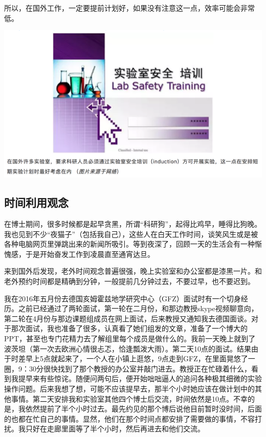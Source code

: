 \documentclass[]{book}
\begin{document}
所以，在国外工作，一定要提前计划好，如果没有注意这一点，效率可能会非常低。

\includegraphics[width=8.33in]{images/osre3}

\subsection{时间利用观念}

在博士期间，很多时候都是起早贪黑，所谓``科研狗''，起得比鸡早，睡得比狗晚。我也见到不少``夜猫子''（包括我自己），这些人在白天工作时间，谈笑风生或是被各种电脑网页里弹跳出来的新闻所吸引。等到夜深了，回顾一天的生活会有一种惭愧感，于是开始奋发工作到凌晨直至通宵达旦。

来到国外后发现，老外时间观念普遍很强，晚上实验室和办公室都是漆黑一片。和老外预约时间都是精确到分钟，一般提前几分钟过去，不要过早，也不要迟到。

我在2016年五月份去德国亥姆霍兹地学研究中心（GFZ）面试时有一个切身经历。之前已经通过了两轮面试，第一轮在二月份，和那边教授skype视频聊意向，第二轮在4月份与那边课题组成员在网上面试，后来教授又通知我去德国面谈。对于那次面试，我也准备了很多，认真看了她们组发的文章，准备了一个博大的PPT，甚至也专门花精力去了解组里每个成员是做什么的。我前一天晚上就到了波茨坦（第一次去欧洲心情很忐忑，恰逢瓢泼大雨）。第二天10点的面试。结果由于时差早上5点就起来了，一个人在小镇上逛悠，9点走到GFZ，在里面晃悠了一圈，9：30分很快找到了那个教授的办公室并敲门进去。教授正在忙碌着什么，看到我提早来有些惊诧。随便问两句后，便开始咄咄逼人的追问各种极其细微的实验操作问题。后来我想了想，可能不应该提早去，那半个小时她应该在做计划中的其他事情。第二天安排我和实验室其他四个博士后交流，时间依然是10点。不幸的是，我依然提前了半个小时过去。最先约见的那个博后说他目前暂时没时间，后面的也都在忙自己的事情。显然，他们在那个时间点都安排了需要做的事情，不容打扰。我只好在走廊里面等了半个小时，然后再进去和他们交流。
\end{document}
